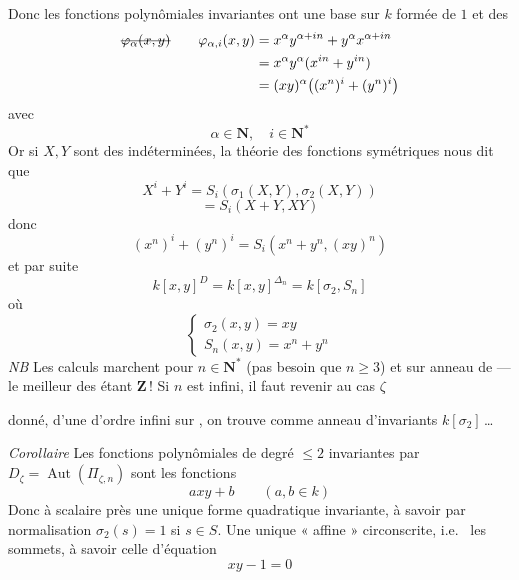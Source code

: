 \documentclass[11pt,a4paper]{article}
\begin{document}
Donc les \struck{\ill{}} fonctions polynômiales invariantes ont une base sur $k$ formée de $1$ et des
\[
\begin{aligned}
\text{\struck{$\varphi_\alpha(x,y)$}}\qquad
\varphi_{\alpha,i}(x,y) &= x^{\alpha} y^{\alpha+in} + y^{\alpha} x^{\alpha+in} \\
&= x^{\alpha}y^{\alpha}(x^{in} + y^{in}) \\
&= (xy)^{\alpha}\bigl((x^{n})^{i} + (y^{n})^{i}\bigr)
\end{aligned}
\]
avec
\[
\alpha \in \mathbf{N}, \quad i \in \mathbf{N}^{*}
\]
 Or si $X, Y$ sont des indéterminées, la théorie des fonctions symétriques nous dit que
\[
X^{i} + Y^{i} = S_i(\sigma_1(X,Y), \sigma_2(X,Y))
\]
\[
= S_i(X+Y, XY)
\]
donc
\[
(x^{n})^{i} + (y^{n})^{i} = S_i(x^{n} + y^{n}, (xy)^{n})
\]
et par suite
\[
k[x,y]^{D} = k[x,y]^{\Delta_n} = k[\sigma_2, S_n]
\]
où
\[
\begin{cases}
\sigma_2(x,y) = xy \\
S_n(x,y) = x^{n} + y^{n}
\end{cases}
\]
\emph{NB} Les calculs marchent pour  $n \in \mathbf{N}^{*}$ (pas besoin que $n \geq 3$) et sur  anneau de  — le meilleur des  étant $\mathbf{Z}$\,! Si $n$ est infini, il faut revenir au cas  $\zeta$

donné,  d'une   d'ordre infini sur  , on trouve \uncertain{\ill{}} comme anneau d'invariants $k[\sigma_2]$\,…

\emph{Corollaire} Les fonctions polynômiales de degré $\leq 2$ invariantes par $D_\zeta = \operatorname{Aut}(\Pi_{\zeta,n})$ sont les fonctions
\[
axy + b \qquad (a, b \in k)
\]
Donc à scalaire près une unique forme  quadratique invariante, à savoir par normalisation $\sigma_2(s) = 1$ si $s \in S$. Une unique  « affine » circonscrite, i.e.\  les sommets, à savoir celle d'équation
\[
xy - 1 = 0
\]
\struck{\ill{}}
\struck{\ill{}}
\end{document}
